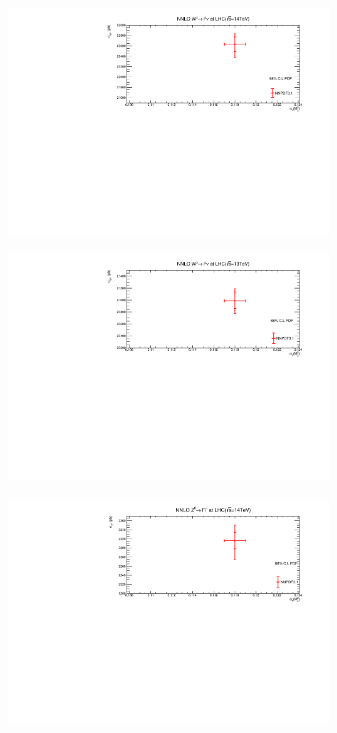 \begin{figure}[H]{\label{WZ13_14}}
\centering
\begin{subfigure}{0.49\textwidth}
\includegraphics[height=6cm ,width=\textwidth]{chapter4/W14.pdf}
\vspace*{-6mm}
\caption{}
\label{w14}
\end{subfigure}
\begin{subfigure}{0.49\textwidth}
\includegraphics[height=6cm, width=\textwidth]{chapter4/W13.pdf}
\vspace*{-6mm}
\caption{}
\label{w13}
\end{subfigure}
\begin{subfigure}{0.49\textwidth}
\includegraphics[height=6cm, width=\textwidth]{chapter4/Z14.pdf}
\vspace*{-6mm}
\caption{}

\end{subfigure}
\end{figure}

